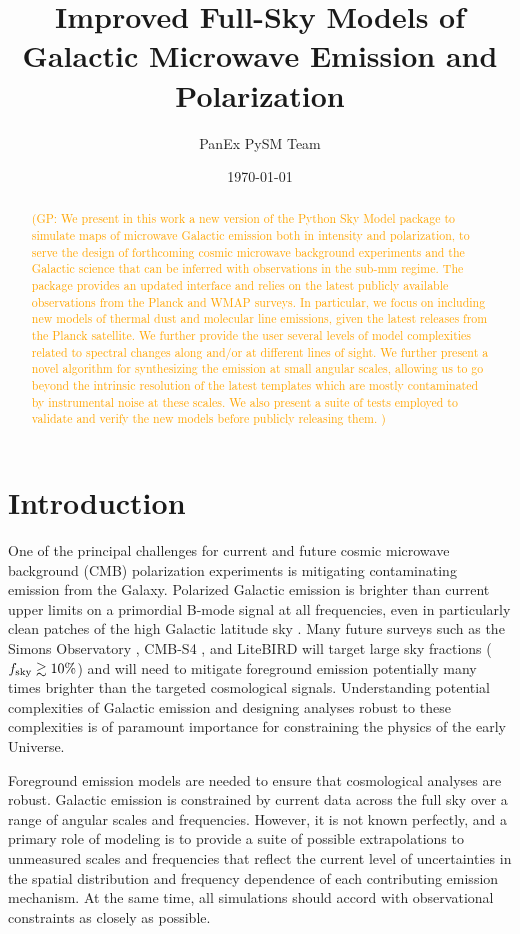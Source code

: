\documentclass[twocolumn]{aastex631}
\newcommand{\giuse}[1]{\textcolor{orange}{(GP: #1)}}
\begin{document}
\title{Improved Full-Sky Models of Galactic Microwave Emission and Polarization}
\author{PanEx PySM Team}
\date{\today}

\begin{abstract}
\giuse{We present in this work a new version of the Python Sky Model package to simulate maps of microwave Galactic emission both in intensity and polarization, to serve the design of forthcoming  cosmic microwave background experiments and the Galactic science that can be inferred with observations in the sub-mm regime. The package  provides  an updated interface and relies on  the latest publicly available observations  from the Planck and WMAP surveys. In particular, we focus on including new models of thermal dust and molecular line emissions, given the latest releases from the Planck satellite.  We further provide the user several levels of model complexities related to spectral changes along and/or at different lines of sight. We further  present a novel algorithm for synthesizing the  emission at small angular scales,  allowing us to go beyond the intrinsic resolution of the latest templates which are mostly contaminated by  instrumental noise at these scales. We also  present a  suite of tests employed to validate and verify the new models before publicly releasing them. } 

\end{abstract}

\section{Introduction}
One of the principal challenges for current and future cosmic microwave background (CMB) polarization experiments is mitigating contaminating emission from the Galaxy. Polarized Galactic emission is brighter than current upper limits on a primordial B-mode signal at all frequencies, even in particularly clean patches of the high Galactic latitude sky \citep{planck2016-l11A}. Many future surveys such as the Simons Observatory \citep{Ade:2019}, CMB-S4 \citep{Abazajian:2022}, and LiteBIRD \citep{LiteBIRDCollaboration:2023} will target large sky fractions ($f_{\rm sky} \gtrsim 10\%$) and will need to mitigate foreground emission potentially many times brighter than the targeted cosmological signals. Understanding potential complexities of Galactic emission and designing analyses robust to these complexities is of paramount importance for constraining the physics of the early Universe.

Foreground emission models are needed to ensure that cosmological analyses are robust. Galactic emission is constrained by current data across the full sky over a range of angular scales and frequencies. However, it is not known perfectly, and a primary role of modeling is to provide a suite of possible extrapolations to unmeasured scales and frequencies that reflect the current level of uncertainties in the spatial distribution and frequency dependence of each contributing emission mechanism. At the same time, all simulations should accord with observational constraints as closely as possible.
\end{document}
